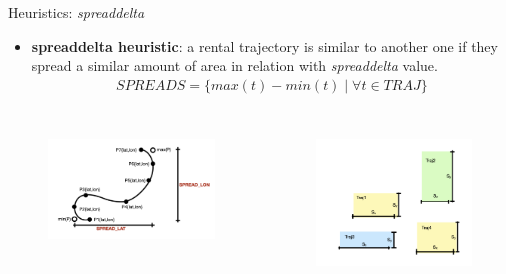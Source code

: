 \documentclass{beamer}
\begin{document}
\begin{frame}{Heuristics: \textit{spreaddelta}}
	\begin{itemize}
		\item \textbf{spreaddelta heuristic}: a rental trajectory is similar to another one if they spread a similar amount of area in relation with \textit{spreaddelta} value. 
		\begin{align}
			SPREADS = \{max(t) - min(t) \mid \forall t \in TRAJ \}
		\end{align}
	\end{itemize}

	\begin{columns}[t, onlytextwidth]
		\begin{figure}[bt]
			\centering
			\includegraphics[width=\textwidth]{spreaddelta-calc}
			\label{fig:spreaddelta-calc}
		\end{figure}
		\begin{figure}[bt]
			\centering
			\includegraphics[width=\textwidth]{spreaddelta-pred}
			\label{fig:spreaddelta-pred}
		\end{figure}
	\end{columns}
\end{frame}
\end{document}
